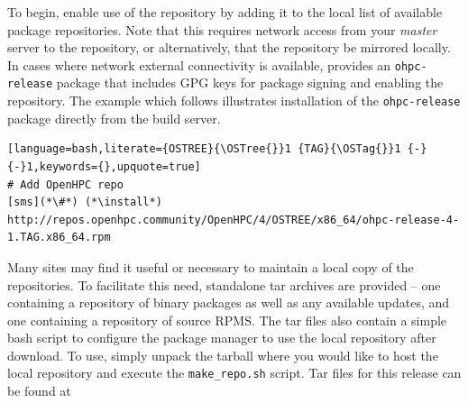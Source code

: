To begin, enable use of the \OHPC{} repository by adding it to the local list
of available package repositories. Note that this requires network access from
your {\em master} server to the \OHPC{} repository, or alternatively, that
the \OHPC{} repository be mirrored locally.  In cases where network external
connectivity is available, \OHPC{} provides an \texttt{ohpc-release} package
that includes GPG keys for package signing and enabling the repository.  The
example which follows illustrates installation of the \texttt{ohpc-release}
package directly from the \OHPC{} build server.

\begin{lstlisting}[language=bash,literate={OSTREE}{\OSTree{}}1 {TAG}{\OSTag{}}1 {-}{-}1,keywords={},upquote=true]
# Add OpenHPC repo
[sms](*\#*) (*\install*) http://repos.openhpc.community/OpenHPC/4/OSTREE/x86_64/ohpc-release-4-1.TAG.x86_64.rpm
\end{lstlisting}

\begin{center}
\begin{tcolorbox}[]
\small Many sites may find it useful or necessary to maintain a local copy of the
\OHPC{} repositories. To facilitate this need, standalone tar
archives are provided -- one containing a repository of binary packages as well as any
available updates, and one containing a repository of source RPMS. The tar files
also contain a simple bash script to configure the package manager to use the
local repository after download. To use, simply unpack the tarball where you
would like to host the local repository and execute the \texttt{make\_repo.sh} script.
Tar files for this release can be found at \href{http://repos.openhpc.community/dist/\OHPCVersion}
        {\color{blue}{http://repos.openhpc.community/dist/\OHPCVersion}}
\end{tcolorbox}
\end{center}
